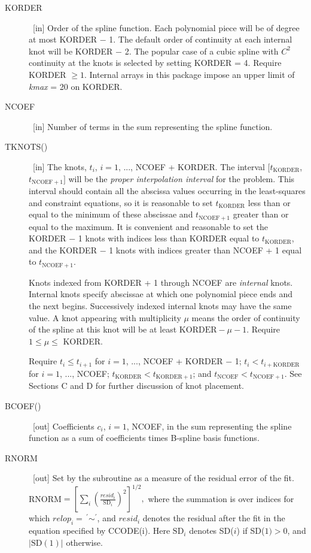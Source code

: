 \documentclass[twoside]{MATH77}
\begin{document}
\begin{description}
\item[KORDER]  \ [in] Order of the spline function. Each polynomial piece
will be of degree at most KORDER $-$ 1. The default order of continuity at
each internal knot will be KORDER $-$ 2. The popular case of a cubic spline
with $C^2$ continuity at the knots is selected by setting KORDER = 4.
Require KORDER $\geq 1$. Internal arrays in this package impose an upper
limit of {\em kmax} = 20 on KORDER.

\item[NCOEF]  \ [in] Number of terms in the sum representing the spline
function.

\item[TKNOTS()]  \ [in] The knots, $t_i$, $i=1$, ..., NCOEF + KORDER. The
interval $[t_{\text{KORDER}}$, $t_{\text{NCOEF}+1}]$ will be the {\em proper
interpolation interval} for the problem. This interval should contain all the
abscissa values occurring in the least-squares and constraint equations, so
it is reasonable to set $t_{\text{KORDER}}$ less than or equal to the
minimum of these abscissae and $t_{\text{NCOEF}+1}$ greater than or equal to
the maximum. It is convenient and reasonable to set the KORDER $-$ 1 knots
with indices less than KORDER equal to $t_{\text{KORDER}}$, and the KORDER $-$
1 knots with indices greater than NCOEF + 1 equal to $t_{\text{NCOEF}+1}.$

Knots indexed from KORDER + 1 through NCOEF are {\em internal} knots. Internal
knots specify abscissae at which one polynomial piece ends and the next
begins. Successively indexed internal knots may have the same value. A knot
appearing with multiplicity $\mu $ means the order of continuity of the
spline at this knot will be at least $\text{KORDER}-\mu -1$. Require $1\leq \mu
\leq $ KORDER.

Require $t_i\leq t_{i+1}$ for $i=1$, ..., NCOEF + KORDER $-$ 1; $t_i<t_{i+%
\text{KORDER}}$ for $i=1$, ..., NCOEF; $t_{\text{KORDER}}<t_{\text{KORDER}+1}$;
and $t_{\text{NCOEF}}<t_{\text{NCOEF}+1}$. See Sections C and D for
further discussion of knot placement.

\item[BCOEF()]  \ [out] Coefficients $c_i$, $i=1$, NCOEF, in the sum
representing the spline function as a sum of coefficients times B-spline
basis functions.

\item[RNORM]  \ [out] Set by the subroutine as a measure of the residual
error of the fit. RNORM$=\left[ \sum_i \left( \frac{resid_i}{\text{SD}_i}%
\right) ^2\right] ^{1/2},$ where the summation is over indices for which $%
relop_i=\,^{\prime }{\sim }^{\prime }$, and $resid_i$ denotes the residual after the
fit in the equation specified by CCODE(i).  Here $\text{SD}_i$ denotes SD($i$)
if SD($1)>0$, and $|\text{SD}(1)|$ otherwise.


\end{description}
\end{document}
